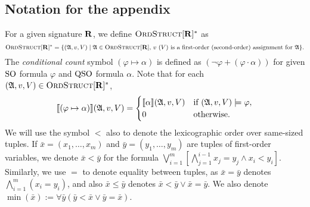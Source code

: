 
\subsection{Notation for the appendix}

For a given signature $\mathbf{R}$, we define $\text{\sc OrdStruct}[\mathbf{R}]^*$ as $$\text{\sc OrdStruct}[\mathbf{R}]^* = \{(\mathfrak{A},v,V) \mid \mathfrak{A}\in\text{\sc OrdStruct}[\mathbf{R}]\text{, $v$ ($V$) is a first-order (second-order) assignment for $\mathfrak{A}$}  \}.$$
The {\em conditional count} symbol $(\varphi \mapsto \alpha)$ is defined as $(\neg\varphi + (\varphi\cdot\alpha))$ for given ${\rm SO}$ formula $\varphi$ and ${\rm QSO}$ formula $\alpha$. Note that for each $(\mathfrak{A},v,V) \in \text{\sc OrdStruct}[\mathbf{R}]^*$, 
$$
{\llbracket{}{(\varphi \mapsto \alpha)}\rrbracket}(\mathfrak{A},v,V) = 
\begin{cases}
{\llbracket{}{\alpha}\rrbracket}(\mathfrak{A},v,V) &\text{if } (\mathfrak{A},v,V)\models\varphi,\\
0 &\text{otherwise}.
\end{cases}
$$
We will use the symbol $<$ also to denote the lexicographic order over same-sized tuples. If $\bar{x} = (x_1,\ldots,x_m)$ and $\bar{y} = (y_1,\ldots,y_m)$ are tuples of first-order variables, we denote $\bar{x} < \bar{y}$ for the formula $\bigvee_{i = 1}^m[\bigwedge_{j = 1}^{i-1}x_j = y_j \wedge x_i < y_i]$. Similarly, we use $=$ to denote equality between tuples, as $\bar{x} = \bar{y}$ denotes $\bigwedge_{i = 1}^m(x_i = y_i)$, and also $\bar{x}\leq\bar{y}$ denotes $\bar{x} < \bar{y} \vee \bar{x} = \bar{y}$. We also denote $\min(\bar{x}) := \forall\bar{y}(\bar{y} < \bar{x}\vee \bar{y} = \bar{x})$.

